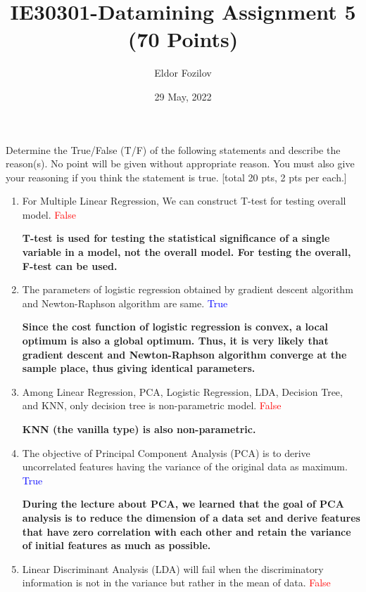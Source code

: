 \documentclass{homework}
\title{IE30301-Datamining Assignment 5 (70 Points)}
\author{Eldor Fozilov}
\date{29 May, 2022}
\begin{document}
    \maketitle
    \exercise*
    Determine the True/False (T/F) of the following statements and describe the reason(s). No point will be given without appropriate reason. You must also give your reasoning if you think the statement is true. [total 20 pts, 2 pts per each.]  \\
    \begin{enumerate}
        \item {For Multiple Linear Regression, We can construct T-test for testing overall model.} \textcolor{red}{False}
        
        \textbf{T-test is used for testing the statistical significance of a single variable in a model, not the overall model. For testing the overall, F-test can be used.}
        
        \item {The parameters of logistic regression obtained by gradient descent algorithm and Newton-Raphson algorithm are same.} \textcolor{blue}{True}
        
        \textbf{Since the cost function of logistic regression is convex, a local optimum is also a global optimum. Thus, it is very likely that gradient descent and Newton-Raphson algorithm converge at the sample place, thus giving identical parameters.}
        
        \item {Among Linear Regression, PCA, Logistic Regression, LDA, Decision Tree, and KNN, only decision tree is non-parametric model.} \textcolor{red}{False}
        
        \textbf{
        KNN (the vanilla type) is also non-parametric.}
        
        \item {The objective of Principal Component Analysis (PCA) is to derive uncorrelated features having the variance of the original data as maximum.}
        \textcolor{blue}{True}
        
        \textbf{During the lecture about PCA, we learned that the goal of PCA analysis is to reduce the dimension of a data set and derive features that have zero correlation with each other and retain the variance of initial features as much as possible.}
        
        \item {Linear Discriminant Analysis (LDA) will fail when the discriminatory information is not in the variance but rather in the mean of data.} \textcolor{red}{False}
        

\end{enumerate}
\end{document}
